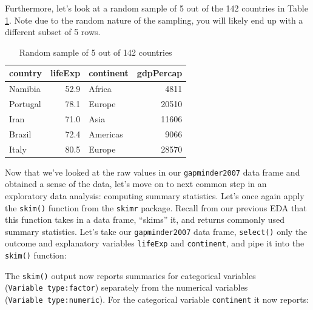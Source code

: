\documentclass[12pt, krantz2,]{krantz}
\makeatletter
\newenvironment{Shaded}{\begin{snugshade}}{\end{snugshade}}
\newcommand{\DataTypeTok}[1]{\textcolor[rgb]{0.27,0.27,0.27}{#1}}
\newcommand{\DecValTok}[1]{\textcolor[rgb]{0.06,0.06,0.06}{#1}}
\newcommand{\KeywordTok}[1]{\textcolor[rgb]{0.27,0.27,0.27}{\textbf{#1}}}
\newcommand{\NormalTok}[1]{#1}
\newcommand{\OperatorTok}[1]{\textcolor[rgb]{0.43,0.43,0.43}{\textbf{#1}}}
\newcommand{\StringTok}[1]{\textcolor[rgb]{0.5,0.5,0.5}{#1}}
\newenvironment{kframe}{%
\medskip{}
\setlength{\fboxsep}{.8em}
 \def\at@end@of@kframe{}%
 \ifinner\ifhmode%
  \def\at@end@of@kframe{\end{minipage}}%
  \begin{minipage}{\columnwidth}%
 \fi\fi%
 \def\FrameCommand##1{\hskip\@totalleftmargin \hskip-\fboxsep
 \colorbox{shadecolor}{##1}\hskip-\fboxsep
     \hskip-\linewidth \hskip-\@totalleftmargin \hskip\columnwidth}%
 \MakeFramed {\advance\hsize-\width
   \@totalleftmargin\z@ \linewidth\hsize
   \@setminipage}}%
 {\par\unskip\endMakeFramed%
 \at@end@of@kframe}
\renewenvironment{Shaded}{\begin{kframe}}{\end{kframe}}
\makeatother
\begin{document}
Furthermore, let's look at a random sample of 5 out of the 142 countries in Table \ref{tab:model2-data-preview}. Note due to the random nature of the sampling, you will likely end up with a different subset of 5 rows.

\begin{Shaded}
\end{Shaded}

\begin{table}[H]

\caption{\label{tab:model2-data-preview}Random sample of 5 out of 142 countries}
\centering
\fontsize{10}{12}\selectfont
\begin{tabular}{lrlr}
\toprule
country & lifeExp & continent & gdpPercap\\
\midrule
Namibia & 52.9 & Africa & 4811\\
Portugal & 78.1 & Europe & 20510\\
Iran & 71.0 & Asia & 11606\\
Brazil & 72.4 & Americas & 9066\\
Italy & 80.5 & Europe & 28570\\
\bottomrule
\end{tabular}
\end{table}

Now that we've looked at the raw values in our \texttt{gapminder2007} data frame and obtained a sense of the data, let's move on to next common step in an exploratory data analysis: computing summary statistics. Let's once again apply the \texttt{skim()} function from the \texttt{skimr} package. Recall from our previous EDA that this function takes in a data frame, ``skims'' it, and returns commonly used summary statistics. Let's take our \texttt{gapminder2007} data frame, \texttt{select()} only the outcome and explanatory variables \texttt{lifeExp} and \texttt{continent}, and pipe it into the \texttt{skim()} function:

The \texttt{skim()} output now reports summaries for categorical variables (\texttt{Variable\ type:factor}) separately from the numerical variables (\texttt{Variable\ type:numeric}). For the categorical variable \texttt{continent} it now reports:
\end{document}
